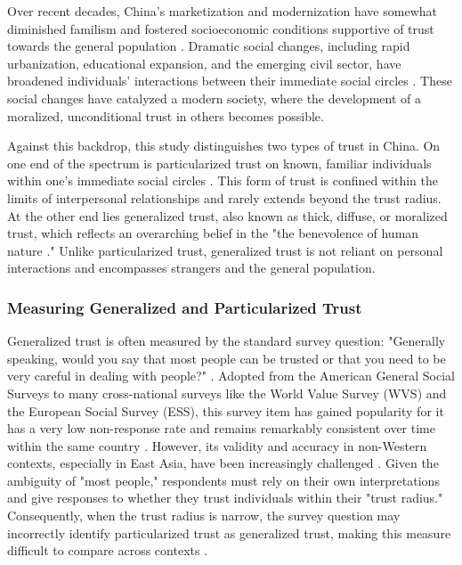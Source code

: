 Over recent decades, China's marketization and modernization have somewhat diminished familism and fostered socioeconomic conditions supportive of trust towards the general population \parencite{xuChangesMainlandChinese2014,yanChineseFamiliesUpside2021}. Dramatic social changes, including rapid urbanization, educational expansion, and the emerging civil sector, have broadened individuals' interactions between their immediate social circles \parencite{bianOccupationClassSocial2005,steinhardtSocioEconomicModernizationCrisis2020}. These social changes have catalyzed a modern society, where the development of a moralized, unconditional trust in others becomes possible.

Against this backdrop, this study distinguishes two types of trust in China. On one end of the spectrum is particularized trust on known, familiar individuals within one's immediate social circles \parencite{delheyHowGeneralTrust2011,kramerIngroupOutgroupTrustBarriers2018,steinhardtSocioEconomicModernizationCrisis2020}. This form of trust is confined within the limits of interpersonal relationships and rarely extends beyond the trust radius. At the other end lies generalized trust, also known as thick, diffuse, or moralized trust, which reflects an overarching belief in the "the benevolence of human nature \parencite[p.~139]{yamagishiTrustCommitmentUnited1994}." Unlike particularized trust, generalized trust is not reliant on personal interactions and encompasses strangers and the general population.

\subsubsection{Measuring Generalized and Particularized Trust}

Generalized trust is often measured by the standard survey question: "Generally speaking, would you say that most people can be trusted or that you need to be very careful in dealing with people?" \parencite{rosenbergMisanthropyPoliticalIdeology1956}. Adopted from the American General Social Surveys to many cross-national surveys like the World Value Survey (WVS) and the European Social Survey (ESS), this survey item has gained popularity for it has a very low non-response rate and remains remarkably consistent over time within the same country \parencite{nannestadWhatHaveWe2008}. However, its validity and accuracy in non-Western contexts, especially in East Asia, have been increasingly challenged \parencite{delheyPredictingCrossNationalLevels2005,glaeserMeasuringTrust2000,torpeIdentifyingSocialTrust2011}. Given the ambiguity of "most people," respondents must rely on their own interpretations and give responses to whether they trust individuals within their "trust radius." Consequently, when the trust radius is narrow, the survey question may incorrectly identify particularized trust as generalized trust, making this measure difficult to compare across contexts \parencite{delheyHowGeneralTrust2011,delheyPredictingCrossNationalLevels2005,torpeIdentifyingSocialTrust2011}.

